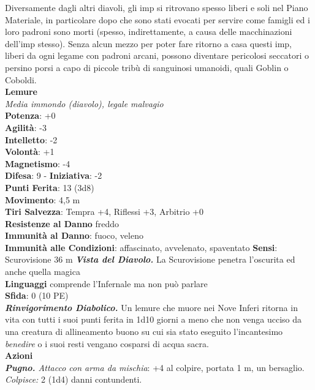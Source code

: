 \begin{multicols}{2}
Diversamente dagli altri diavoli, gli imp si ritrovano spesso liberi e soli nel Piano Materiale, in particolare dopo che sono stati evocati per servire come famigli ed i loro padroni sono morti (spesso, indirettamente, a causa delle macchinazioni dell’imp stesso). Senza alcun mezzo per poter fare ritorno a casa questi imp, liberi da ogni legame con padroni arcani, possono diventare pericolosi seccatori o persino porsi a capo di piccole tribù di sanguinosi umanoidi, quali Goblin o Coboldi.\\


\medskip\textbf{Lemure}\\
\emph{Media immondo (diavolo), legale malvagio}\\
\textbf{Potenza}: +0\\
\textbf{Agilità}: -3\\
\textbf{Intelletto}: -2\\
\textbf{Volontà}: +1\\
\textbf{Magnetismo}: -4\\
\textbf{Difesa}: 9 - \textbf{Iniziativa}: -2\\
\textbf{Punti Ferita}: 13 (3d8)\\
\textbf{Movimento}: 4,5 m\\
\textbf{Tiri Salvezza}: Tempra +4, Riflessi +3, Arbitrio +0\\
\textbf{Resistenze al Danno} freddo\\
\textbf{Immunità al Danno}: fuoco, veleno\\
\textbf{Immunità alle Condizioni}: affascinato, avvelenato, spaventato
\textbf{Sensi}: Scurovisione 36 m
\emph{\textbf{Vista del Diavolo.}} La Scurovisione penetra l'oscurita ed anche quella magica\\
\textbf{Linguaggi} comprende l'Infernale ma non può parlare\\
\textbf{Sfida}: 0 (10 PE)\smallskip\\
\emph{\textbf{Rinvigorimento Diabolico.}} Un lemure che muore nei Nove Inferi ritorna in vita con tutti i suoi punti ferita in 1d10 giorni a meno che non venga ucciso da una creatura di allineamento buono su cui sia stato eseguito l'incantesimo \emph{benedire} o i suoi resti vengano cosparsi di acqua sacra.\\
\smallskip\textbf{Azioni} \\
\emph{\textbf{Pugno.} Attacco con arma da mischia}: +4 al colpire, portata 1 m, un bersaglio.\\
\emph{Colpisce:} 2 (1d4) danni contundenti.\\

\end{multicols}
